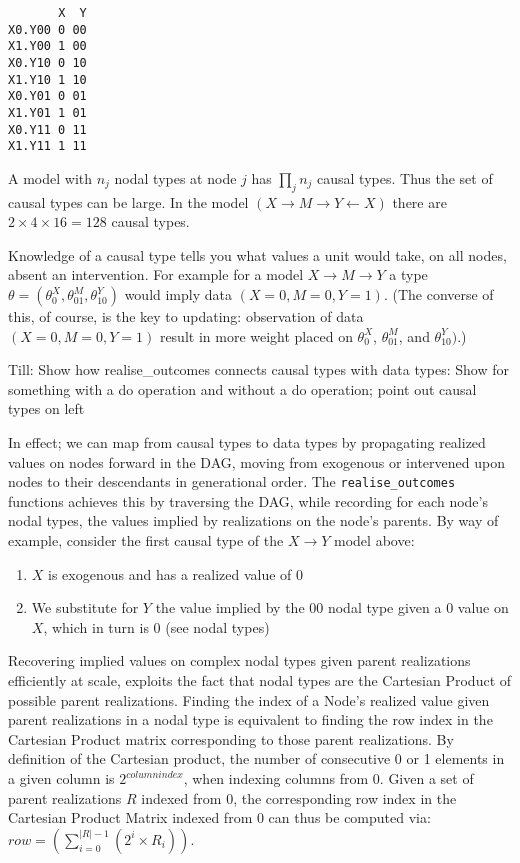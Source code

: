 \documentclass[
  11pt,
  article]{jss}
\providecommand{\tightlist}{%
  \setlength{\itemsep}{0pt}\setlength{\parskip}{0pt}}\usepackage{longtable,booktabs,array}
\begin{document}
\begin{verbatim}
       X  Y
X0.Y00 0 00
X1.Y00 1 00
X0.Y10 0 10
X1.Y10 1 10
X0.Y01 0 01
X1.Y01 1 01
X0.Y11 0 11
X1.Y11 1 11
\end{verbatim}

A model with \(n_j\) nodal types at node \(j\) has \(\prod_jn_j\) causal
types. Thus the set of causal types can be large. In the model
\((X\rightarrow M \rightarrow Y \leftarrow X)\) there are
\(2\times 4\times 16 = 128\) causal types.

Knowledge of a causal type tells you what values a unit would take, on
all nodes, absent an intervention. For example for a model
\(X \rightarrow M \rightarrow Y\) a type
\(\theta = (\theta^X_0, \theta^M_{01}, \theta^Y_{10})\) would imply data
\((X=0, M=0, Y=1)\). (The converse of this, of course, is the key to
updating: observation of data \((X=0, M=0, Y=1)\) result in more weight
placed on \(\theta^X_0\), \(\theta^M_{01}\), and \(\theta^Y_{10})\).)

Till: Show how realise\_outcomes connects causal types with data types:
Show for something with a do operation and without a do operation; point
out causal types on left

In effect; we can map from causal types to data types by propagating
realized values on nodes forward in the DAG, moving from exogenous or
intervened upon nodes to their descendants in generational order. The
\texttt{realise\_outcomes} functions achieves this by traversing the
DAG, while recording for each node's nodal types, the values implied by
realizations on the node's parents. By way of example, consider the
first causal type of the \(X \rightarrow Y\) model above:

\begin{enumerate}
\def\labelenumi{\arabic{enumi}.}
\tightlist
\item
  \(X\) is exogenous and has a realized value of \(0\)
\item
  We substitute for \(Y\) the value implied by the \(00\) nodal type
  given a \(0\) value on \(X\), which in turn is \(0\) (see nodal types)
\end{enumerate}

Recovering implied values on complex nodal types given parent
realizations efficiently at scale, exploits the fact that nodal types
are the Cartesian Product of possible parent realizations. Finding the
index of a Node's realized value given parent realizations in a nodal
type is equivalent to finding the row index in the Cartesian Product
matrix corresponding to those parent realizations. By definition of the
Cartesian product, the number of consecutive 0 or 1 elements in a given
column is \(2^{columnindex}\), when indexing columns from 0. Given a set
of parent realizations \(R\) indexed from 0, the corresponding row index
in the Cartesian Product Matrix indexed from 0 can thus be computed via:
\(row = (\sum_{i = 0}^{|R| - 1} (2^{i} \times R_i))\).
\end{document}
